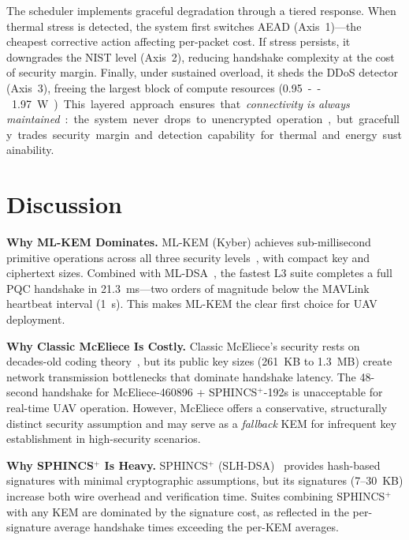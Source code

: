 \documentclass[conference]{IEEEtran}
\begin{document}
The scheduler implements graceful degradation through a tiered response.
When thermal stress is detected, the system first switches AEAD (Axis~1)---the cheapest corrective action affecting per-packet cost.
If stress persists, it downgrades the NIST level (Axis~2), reducing handshake complexity at the cost of security margin.
Finally, under sustained overload, it sheds the DDoS detector (Axis~3), freeing the largest block of compute resources (\SI{0.95}--\SI{1.97}{\watt}).

This layered approach ensures that \emph{connectivity is always maintained}: the system never drops to unencrypted operation, but gracefully trades security margin and detection capability for thermal and energy sustainability.

\section{Discussion}
\label{sec:discussion}

\textbf{Why ML-KEM Dominates.}
ML-KEM (Kyber) achieves sub-millisecond primitive operations across all three security levels~\cite{kyber}, with compact key and ciphertext sizes.
Combined with ML-DSA~\cite{dilithium}, the fastest L3 suite completes a full PQC handshake in \SI{21.3}{\milli\second}---two orders of magnitude below the MAVLink heartbeat interval (\SI{1}{\second}).
This makes ML-KEM the clear first choice for UAV deployment.

\textbf{Why Classic McEliece Is Costly.}
Classic McEliece's security rests on decades-old coding theory~\cite{mceliece}, but its public key sizes (261~KB to 1.3~MB) create network transmission bottlenecks that dominate handshake latency.
The 48-second handshake for McEliece-460896 + SPHINCS$^+$-192s is unacceptable for real-time UAV operation.
However, McEliece offers a conservative, structurally distinct security assumption and may serve as a \emph{fallback} KEM for infrequent key establishment in high-security scenarios.

\textbf{Why SPHINCS$^+$ Is Heavy.}
SPHINCS$^+$ (SLH-DSA)~\cite{sphincsplus} provides hash-based signatures with minimal cryptographic assumptions, but its signatures (7--30~KB) increase both wire overhead and verification time.
Suites combining SPHINCS$^+$ with any KEM are dominated by the signature cost, as reflected in the per-signature average handshake times exceeding the per-KEM averages.
\end{document}

